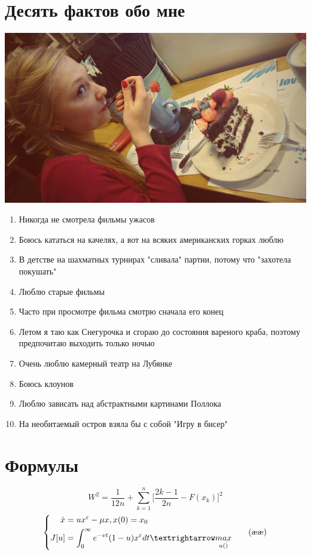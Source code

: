 \documentclass[12pt, a4paper]{article}
\begin{document}
 
\section{Десять фактов обо мне}
\includegraphics[scale=0.15]{ph1.png}
\begin{enumerate}
\item Никогда не смотрела фильмы ужасов
\item Боюсь кататься на качелях, а вот на всяких американских горках люблю
\item В детстве на шахматных турнирах "сливала" партии, потому что "захотела покушать"
\item Люблю старые фильмы
\item Часто при просмотре фильма смотрю сначала его конец
\item Летом я таю как Снегурочка и сгораю до состояния вареного краба, поэтому предпочитаю выходить только ночью
\item Очень люблю камерный театр на Лубянке
\item Боюсь клоунов
\item Люблю зависать над абстрактными картинами Поллока
\item На необитаемый остров взяла бы с собой "Игру в бисер"
\end{enumerate}
\section{Формулы}
\begin{equation}\label{nomer1}
 W^2=\frac{1}{12n}+\sum_{k=1}^n\Bigg[\frac{2k-1}{2n}-F(x_k)\Bigg]^2\tag{\ae}
\end{equation}
\begin{equation}\label{nomer2}
\left \{
\begin{aligned}
\dot{x} &=ux^\varepsilon-\mu x, x(0)=x_0 \\
J[u] &=\int_0^\infty e^{-vt}(1-u)x^\varepsilon dt\textrightarrow \underset{u(\dot)}{max}
\end{aligned}\tag{\ae\ae}
\right.
\end{equation}
\end{document}
